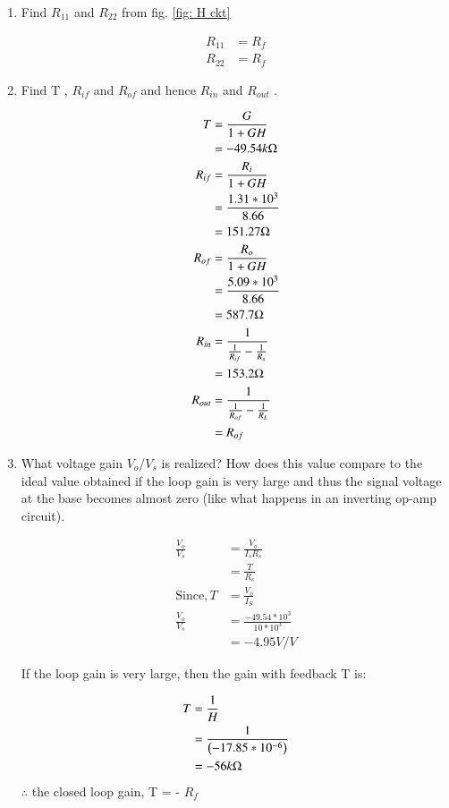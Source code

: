 \begin{enumerate}[label=\thesection.\arabic*.,ref=\thesection.\theenumi]
\item Find $R_{11}$ and $R_{22}$ from fig. \ref{fig:  H ckt}

\solution 

\begin{align}
    R_{11} &= R_{f}\\
    R_{22} &= R_{f}
\end{align}

\item Find T , $R_{if}$  and $R_{of}$ and hence $R_{in}$ and $R_{out}$ .

\solution 
\begin{align}
    T &= \frac{G}{1+GH}\\
    &= -49.54 k\ohm\\
    R_{if} &= \frac{R_{i}}{1 + GH}\\
    &= \frac{1.31*10^3}{8.66}\\
    &= 151.27 \ohm\\
    R_{of} &= \frac{R_{o}}{1+GH}\\
    &= \frac{5.09*10^3}{8.66}\\
    &= 587.7 \ohm\\
    R_{in} &= \frac{1}{\frac{1}{R_{if}} - \frac{1}{R_{s}}}\\
    &=153.2 \ohm\\
    R_{out} &= \frac{1}{\frac{1}{R_{of}} - \frac{1}{R_{L}}}\\
    &= R_{of}
\end{align}

\item What voltage gain $V_{o}$/$V_{s}$ is realized? How does this value
compare to the ideal value obtained if the loop gain is
very large and thus the signal voltage at the base becomes
almost zero (like what happens in an inverting op-amp
circuit).

\solution 
\begin{align}
    \frac{V_{o}}{V_{s}} &= \frac{V_{o}}{I_{s}R_{s}}\\
    &= \frac{T}{R_{s}}\\
    \text{Since}, T &= \frac{V_{o}}{I_{S}}\\
    \frac{V_{o}}{V_{s}} &= \frac{-49.54*10^3}{10*10^3}\\
    &= -4.95 V/V
\end{align}

If the loop gain is very large, then the gain with feedback T is:

\begin{align}
    T &= \frac{1}{H}\\
    &= \frac{1}{\left(-17.85*10^{-6}\right)}\\
    &= -56k\ohm
\end{align}
$\therefore$  the closed loop gain,  T = - $R_{f}$


\end{enumerate}
